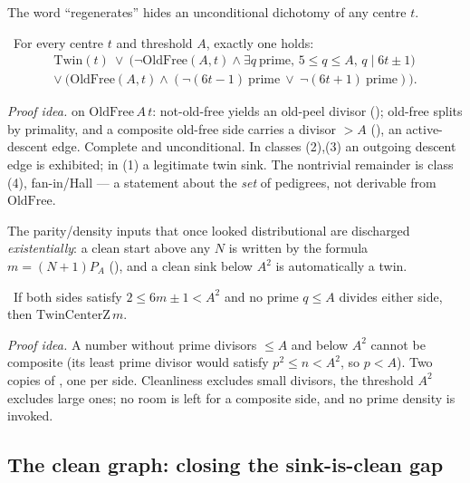 The word ``regenerates'' hides an unconditional dichotomy of any centre $t$.

\begin{theorem}\label{thm:regeneration_dichotomy}
\green{}\ For every centre $t$ and threshold $A$, exactly one holds:
\[
\begin{gathered}
\mathrm{Twin}(t)\ \lor\ \bigl(\neg\mathrm{OldFree}(A,t)\wedge\exists q\ \text{prime},\,5\le q\le A,\,q\mid 6t\pm1\bigr)\\
\lor\ \bigl(\mathrm{OldFree}(A,t)\wedge(\neg(6t-1)\ \text{prime}\ \lor\ \neg(6t+1)\ \text{prime})\bigr).
\end{gathered}
\]
\end{theorem}

\emph{Proof idea.}  on $\mathrm{OldFree}\,A\,t$: not-old-free yields an old-peel divisor
(); old-free splits by primality, and a composite old-free side carries
a divisor $>A$ (), an active-descent edge.
Complete and unconditional. In classes (2),(3) an outgoing descent edge is exhibited; in (1) a
legitimate twin sink. The nontrivial remainder is class (4), fan-in/Hall --- a statement about the
\emph{set} of pedigrees, not derivable from $\mathrm{OldFree}$.

The parity/density inputs that once looked distributional are discharged \emph{existentially}: a clean
start above any $N$ is written by the formula $m=(N+1)P_A$ (), and a
clean sink below $A^2$ is automatically a twin.

\begin{theorem}\label{thm:sink_is_twin}
\green{}\ If both sides satisfy $2\le 6m\pm1<A^2$ and no prime $q\le A$ divides either side, then
$\mathrm{TwinCenterZ}\,m$. 
\end{theorem}

\emph{Proof idea.} A number without prime divisors $\le A$ and below $A^2$ cannot be composite (its
least prime divisor would satisfy $p^2\le n<A^2$, so $p<A$). Two copies of
, one per side. Cleanliness excludes small divisors, the
threshold $A^2$ excludes large ones; no room is left for a composite side, and no prime density is
invoked.

\subsection{The clean graph: closing the sink-is-clean gap}

